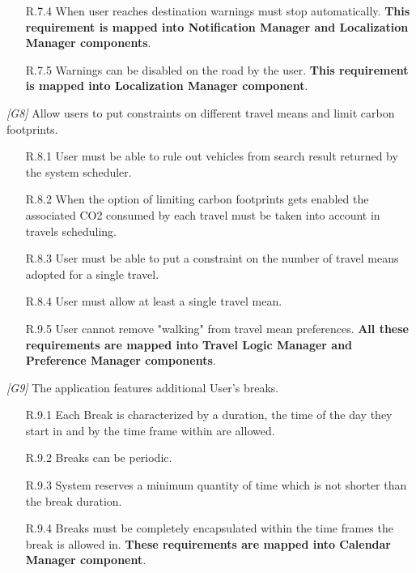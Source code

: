 \begin{description}
\begin{itemize}
			\item [R.7.4] When user reaches destination warnings must stop automatically.
			\textbf{This requirement is mapped into Notification Manager and Localization Manager components}.

			\item [R.7.5] Warnings can be disabled on the road by the user.
			\textbf{This requirement is mapped into Localization Manager component}.
		\end{itemize}


	\item \textit{[G8]} Allow users to put constraints on different travel means and limit carbon footprints.
		\begin{itemize}
			\item[R.8.1] User must be able to rule out vehicles from search result returned by the system scheduler.

			\item[R.8.2] When the option of limiting carbon footprints gets enabled the associated CO2 consumed by each travel must be taken into account in travels scheduling.

			\item[R.8.3] User must be able to put a constraint on the number of travel means adopted for a single travel.

			\item[R.8.4] User must allow at least a single travel mean.

			\item[R.9.5] User cannot remove "walking" from travel mean preferences.		
			\textbf{All these requirements are mapped into Travel Logic Manager and Preference Manager components}.
		\end{itemize}


	\item \textit{[G9]} The application features additional User’s breaks.
		\begin{itemize}
			\item [R.9.1] Each Break is characterized by a duration, the time of the day they start in and by the time frame within are allowed.

			\item[R.9.2] Breaks can be periodic.

			\item[R.9.3] System reserves a minimum quantity of time which is not shorter than the break duration.

			\item[R.9.4] Breaks must be completely encapsulated within the time frames the break is allowed in.
			\textbf{These requirements are mapped into Calendar Manager component}.
			

\end{itemize}
\end{description}
